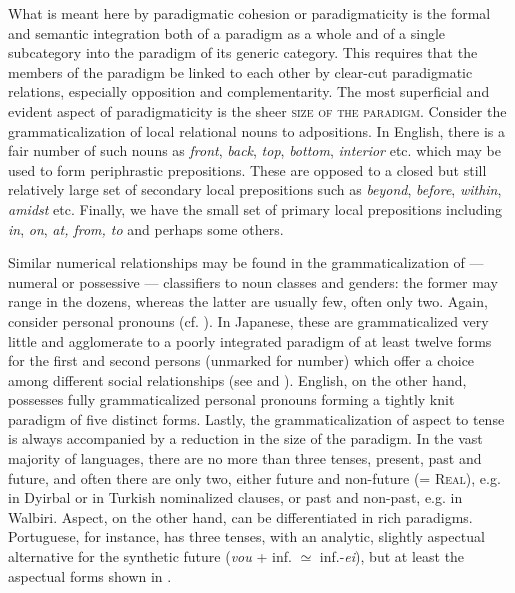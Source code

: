 What is meant here by paradigmatic cohesion or paradigmaticity is the formal and semantic integration both of a paradigm as a whole and of a single subcategory into the paradigm of its generic category. This requires that the members of the paradigm be linked to each other by clear-cut paradigmatic relations, especially opposition and complementarity. The most superficial and evident aspect of paradigmaticity is the sheer \textsc{size of the paradigm}. Consider the grammaticalization of local relational nouns to adpositions. In English, there is a fair number of such nouns as \textit{front}, \textit{back}, \textit{top}, \textit{bottom}, \textit{interior} etc. which may be used to form periphrastic prepositions. These are opposed to a closed but still relatively large set of secondary local prepositions such as \textit{beyond}, \textit{before}, \textit{within}, \textit{amidst} etc. Finally, we have the small set of primary local prepositions including \textit{in}, \textit{on}, \textit{at, from, to} and perhaps some others.

Similar numerical relationships may be found in the grammaticalization of — numeral or possessive — classifiers to noun classes and genders: the former may range in the dozens, whereas the latter are usually few, often only two. Again, consider personal pronouns (cf. ). In Japanese, these are grammaticalized very little and agglomerate to a poorly integrated paradigm of at least twelve forms for the first and second persons (unmarked for number) which offer a choice among different social relationships (see \citealt{Alpatov1980} and \citealt{Coulmas1980}). English, on the other hand, possesses fully grammaticalized personal pronouns forming a tightly knit paradigm of five distinct forms. Lastly, the grammaticalization of aspect to tense is always accompanied by a reduction in the size of the paradigm. In the vast majority of languages, there are no more than three tenses, present, past and future, and often there are only two, either future and non-future (= \textsc{Real}), e.g. in Dyirbal or in Turkish nominalized clauses, or past and non-past, e.g. in Walbiri. Aspect, on the other hand, can be differentiated in rich paradigms. Portuguese, for instance, has three tenses, with an analytic, slightly aspectual alternative for the synthetic future (\textit{vou} + inf. ${\simeq}$ inf.-\textit{ei}), but at least the aspectual forms shown in .

